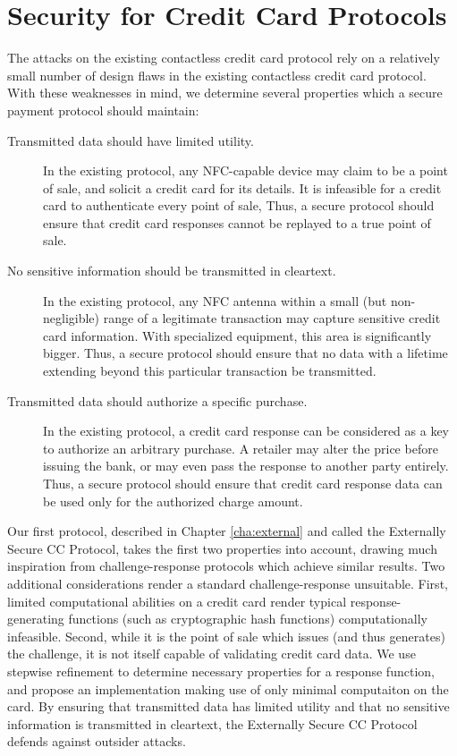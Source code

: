 \section{Security for Credit Card Protocols}
\label{sec:intro-approach-security}

The attacks on the existing contactless credit card protocol rely on a relatively small number of design flaws in the existing contactless credit card protocol.
With these weaknesses in mind, we determine several properties which a secure payment protocol should maintain:

\begin{description}
    \item[Transmitted data should have limited utility.]
        In the existing protocol, any NFC-capable device may claim to be a point of sale, and solicit a credit card for its details.
        It is infeasible for a credit card to authenticate every point of sale,
        Thus, a secure protocol should ensure that credit card responses cannot be replayed to a true point of sale.
    \item[No sensitive information should be transmitted in cleartext.]
        In the existing protocol, any NFC antenna within a small (but non-negligible) range of a legitimate transaction may capture sensitive credit card information.
        With specialized equipment, this area is significantly bigger\cite{brown2013evaluating}.
        Thus, a secure protocol should ensure that no data with a lifetime extending beyond this particular transaction be transmitted.
    \item[Transmitted data should authorize a specific purchase.]
        In the existing protocol, a credit card response can be considered as a key to authorize an arbitrary purchase.
        A retailer may alter the price before issuing the bank, or may even pass the response to another party entirely.
        Thus, a secure protocol should ensure that credit card response data can be used only for the authorized charge amount.
\end{description}

Our first protocol, described in Chapter \ref{cha:external} and called the Externally Secure CC Protocol, takes the first two properties into account,
    drawing much inspiration from challenge-response protocols which achieve similar results.
Two additional considerations render a standard challenge-response unsuitable.
First, limited computational abilities on a credit card render typical response-generating functions
    (such as cryptographic hash functions) computationally infeasible.
Second, while it is the point of sale which issues (and thus generates) the challenge, it is not itself capable of validating credit card data.
We use stepwise refinement to determine necessary properties for a response function, and propose an implementation making use of only minimal computaiton on the card.
By ensuring that transmitted data has limited utility and that no sensitive information is transmitted in cleartext,
    the Externally Secure CC Protocol defends against outsider attacks.

